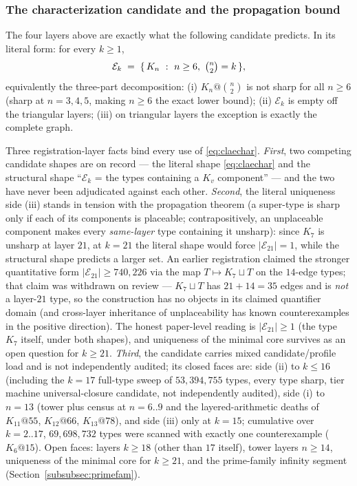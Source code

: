 \subsubsection{The characterization candidate and the propagation
bound}\label{subsubsec:echarcand}

The four layers above are exactly what the following candidate predicts.
In its literal form: for every $k\ge1$,
\begin{equation}\label{eq:claechar}
\mathcal{E}_k \;=\; \{\,K_n\ :\ n\ge6,\ \tbinom n2=k\,\},
\end{equation}
equivalently the three-part decomposition: (i) $K_n@\binom n2$ is not
sharp for all $n\ge6$ (sharp at $n=3,4,5$, making $n\ge6$ the exact lower
bound); (ii) $\mathcal{E}_k$ is empty off the triangular layers; (iii) on
triangular layers the exception is exactly the complete graph.

\begin{remark}\label{rem:claregistry}
Three registration-layer facts bind every use of \eqref{eq:claechar}.
\emph{First}, two competing candidate shapes are on record --- the literal
shape \eqref{eq:claechar} and the structural shape
``$\mathcal{E}_k$ = the types containing a $K_v$ component'' --- and the
two have never been adjudicated against each other. \emph{Second}, the
literal uniqueness side (iii) stands in tension with the propagation
theorem (a super-type is sharp only if each of its components is
placeable; contrapositively, an unplaceable component makes every
\emph{same-layer} type containing it unsharp): since $K_7$ is unsharp at
layer $21$, at $k=21$ the literal shape would force
$|\mathcal{E}_{21}|=1$, while the structural shape predicts a larger set.
An earlier registration claimed the stronger quantitative form
$|\mathcal{E}_{21}|\ge740{,}226$ via the map $T\mapsto K_7\sqcup T$ on the
$14$-edge types; that claim was withdrawn on review --- $K_7\sqcup T$ has
$21+14=35$ edges and is \emph{not} a layer-$21$ type, so the construction
has no objects in its claimed quantifier domain (and cross-layer
inheritance of unplaceability has known counterexamples in the positive
direction). The honest paper-level reading is
$|\mathcal{E}_{21}|\ge1$ (the type $K_7$ itself, under both shapes), and
uniqueness of the minimal core survives as an open question for $k\ge21$.
\emph{Third}, the candidate
carries mixed candidate/profile load and is not independently audited;
its closed faces are: side (ii) to $k\le16$ (including the $k=17$
full-type sweep of $53{,}394{,}755$ types, every type sharp, tier
machine universal-closure candidate, not independently audited), side (i)
to $n=13$ (tower plus census at $n=6..9$ and the layered-arithmetic
deaths of $K_{11}@55$, $K_{12}@66$, $K_{13}@78$), and side (iii) only at
$k=15$; cumulative over $k=2..17$, $69{,}698{,}732$ types were scanned
with exactly one counterexample ($K_6@15$). Open faces: layers $k\ge18$
(other than $17$ itself), tower layers $n\ge14$, uniqueness of the
minimal core for $k\ge21$, and the prime-family infinity segment
(Section~\ref{subsubsec:primefam}).
\end{remark}

